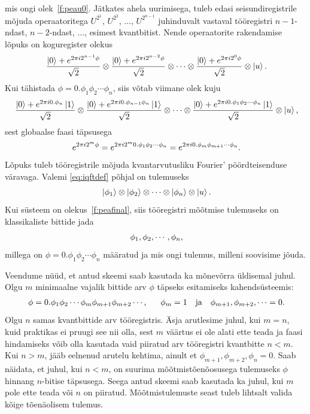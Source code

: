 \documentclass[12pt]{report}
\def\ket#1{\left|#1\right>}
\begin{document}
mis ongi olek~\eqref{f:peau0}.
Jätkates ahela uurimisega, tuleb edasi seisundiregistrile mõjuda operaatoritega \(U^{2^1}\), \(U^{2^2}\), \(\ldots\), \(U^{2^{n-1}}\) juhinduvalt vastaval tööregistri \(n-1\)-ndast, \(n-2\)-ndast, \(\ldots\), esimest kvantbitist.
Nende operaatorite rakendamise lõpuks on koguregister olekus
\begin{align}\label{f:peauend}
    \frac{\ket{0}+ e^{2\pi i2^{n-1}\phi}}{\sqrt{2}}
    \otimes \frac{\ket{0}+ e^{2\pi i2^{n-2}\phi}}{\sqrt{2}}
    \otimes\cdots
    \otimes \frac{\ket{0}+ e^{2\pi i2^0\phi}}{\sqrt{2}}
    \otimes\ket{u} \rlap{.}
\end{align}
Kui tähistada \(\phi=0.\phi_1\phi_2\cdots\phi_n\), siis võtab viimane olek kuju
\begin{align}
    \frac{\ket{0}+ e^{2\pi i0.\phi_n}\ket{1}}{\sqrt{2}}
    \otimes \frac{\ket{0}+ e^{2\pi i0.\phi_{n-1}\phi_n}\ket{1}}{\sqrt{2}}
    \otimes\cdots
    \otimes \frac{\ket{0}+ e^{2\pi i0.\phi_1\phi_2\cdots\phi_n}\ket{1}}{\sqrt{2}}
    \otimes\ket{u} \rlap{,}
\end{align}
sest globaalse faasi täpsusega
\begin{align}
    e^{2\pi i2^m\phi}
    = e^{2\pi i2^m 0.\phi_1\phi_2\cdots\phi_n}
    = e^{2\pi i0.\phi_m\phi_{m+1}\cdots\phi_n} \rlap{.}
\end{align}
Lõpuks tuleb tööregistrile mõjuda kvantarvutusliku Fourier' pöördteisenduse väravaga.
Valemi \eqref{eq:iqftdef} põhjal on tulemuseks
\begin{align}\label{f:peafinal}
    \ket{\phi_1} \otimes \ket{\phi_2} \otimes \cdots \otimes \ket{\phi_n} \otimes \ket{u} \rlap{.}
\end{align}
Kui süsteem on olekus~\eqref{f:peafinal}, siis tööregistri mõõtmise tulemuseks on klassikaliste bittide jada
\begin{align}
    \phi_1, \phi_2, \cdots, \phi_n \rlap{,}
\end{align}
millega on \(\phi = 0.\phi_1\phi_2 \cdots \phi_n\) määratud ja mis ongi tulemus, milleni soovisime jõuda.

Veendume nüüd, et antud skeemi saab kasutada ka mõnevõrra üldisemal juhul.
Olgu \(m\) minimaalne vajalik bittide arv \(\phi\) täpseks esitamiseks kahendsüsteemis:
\begin{align}
   \phi=0.\phi_1\phi_2\cdots\phi_m\phi_{m+1}\phi_{m+2}\cdots \text{}
   \rlap{,} \qquad \phi_m = 1 \quad\text{ja}\quad \phi_{m+1}, \phi_{m+2}, \cdots = 0 \rlap{.}
\end{align}
Olgu \(n\) samas kvantbittide arv tööregistris.
Äsja arutlesime juhul, kui \(m = n\), kuid praktikas ei pruugi see nii olla, sest \(m\) väärtus ei ole alati ette teada ja faasi hindamiseks võib olla kasutada vaid piiratud arv tööregistri kvantbitte \(n < m\).
Kui \(n > m\), jääb eelnenud arutelu kehtima, ainult et \(\phi_{m+1}, \phi_{m+2}, \phi_n = 0\).
Saab näidata, et juhul, kui \(n < m\), on suurima mõõtmistõenõosusega tulemuseks \(\phi\) hinnang \(n\)-bitise täpsusega.
Seega antud skeemi saab kasutada ka juhul, kui \(m\) pole ette teada või \(n\) on piiratud.
Mõõtmis\-tulemuste seast tuleb lihtsalt 	valida kõige tõenäolisem tulemus.
\end{document}
